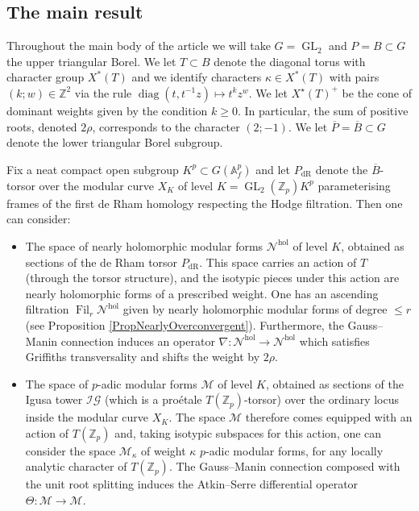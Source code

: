 \documentclass[10pt, oneside]{amsart}
\numberwithin{equation}{subsection}
\theoremstyle{definition}
\theoremstyle{remark}
\newcommand{\mbb}[1]{\mathbb{#1}}
\newcommand{\opn}[1]{\operatorname{#1}}
\def\Z{{\mathbb{Z}}}
\begin{document}
\subsection{The main result} \label{TheMainResultIntroSubSec}

Throughout the main body of the article we will take $G = \opn{GL}_2$ and $P=B \subset G$ the upper triangular Borel. We let $T \subset B$ denote the diagonal torus with character group $X^*(T)$ and we identify characters $\kappa \in X^*(T)$ with pairs $(k; w) \in \Z^2$ via the rule $\opn{diag}(t, t^{-1}z) \mapsto t^k z^w$. We let $X^\star(T)^+$ be the cone of dominant weights given by the condition $k \geq 0$. In particular, the sum of positive roots, denoted $2\rho$, corresponds to the character $(2; -1)$. We let $\overline{P} = \overline{B} \subset G$ denote the lower triangular Borel subgroup.

Fix a neat compact open subgroup $K^p \subset G(\mbb{A}_f^p)$ and let $P_{\opn{dR}}$ denote the $\overline{B}$-torsor over the modular curve $X_K$ of level $K=\opn{GL}_2(\mbb{Z}_p) K^p$ parameterising frames of the first de Rham homology respecting the Hodge filtration. Then one can consider:
\begin{itemize}
    \item The space of nearly holomorphic modular forms $\mathscr{N}^{\opn{hol}}$ of level $K$, obtained as sections of the de Rham torsor $P_{\opn{dR}}$. This space carries an action of $T$ (through the torsor structure), and the isotypic pieces under this action are nearly holomorphic forms of a prescribed weight. One has an ascending filtration $\opn{Fil}_r\mathscr{N}^{\opn{hol}}$ given by nearly holomorphic modular forms of degree $\leq r$ (see Proposition \ref{PropNearlyOverconvergent}). Furthermore, the Gauss--Manin connection induces an operator $\nabla \colon \mathscr{N}^{\opn{hol}} \to \mathscr{N}^{\opn{hol}}$ which satisfies Griffiths transversality and shifts the weight by $2\rho$.
    \item The space of $p$-adic modular forms $\mathscr{M}$ of level $K$, obtained as sections of the Igusa tower $\mathcal{IG}$ (which is a pro\'{e}tale $T(\mbb{Z}_p)$-torsor) over the ordinary locus inside the modular curve $X_K$. The space $\mathscr{M}$ therefore comes equipped with an action of $T(\mbb{Z}_p)$ and, taking isotypic subspaces for this action, one can consider the space $\mathscr{M}_{\kappa}$ of weight $\kappa$ $p$-adic modular forms, for any locally analytic character of $T(\mbb{Z}_p)$. The Gauss--Manin connection composed with the unit root splitting induces the Atkin--Serre differential operator $\Theta \colon \mathscr{M} \to \mathscr{M}$.
\end{itemize}
\end{document}
